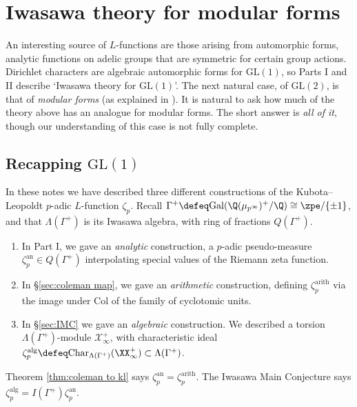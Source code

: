 \documentclass[a4paper,10pt, english, reqno]{smfart}
\newcommand{\GL}{\mathrm{GL}}
\newcommand{\sX}{\mathscr{X}}
\numberwithin{equation}{section}
\begin{document}
\section{Iwasawa theory for modular forms}\label{sec:modular forms}

An interesting source of $L$-functions are those arising from automorphic forms, analytic functions on adelic groups that are symmetric for certain group actions. Dirichlet characters are algebraic automorphic forms for $\GL(1)$, so Parts I and II describe `Iwasawa theory for $\GL(1)$'.  The next natural case, of $\GL(2)$, is that of \emph{modular forms} (as explained in \cite{Wei71}). It is natural to ask how much of the theory above has an analogue for modular forms. The short answer is \textit{all of it}, though our understanding of this case is not fully complete.



\subsection{Recapping $\mathrm{GL}(1)$}

In these notes we have described three different constructions of the Kubota--Leopoldt $p$-adic $L$-function $\zeta_p$. Recall  $\Gamma^+  \defeq \mathrm{Gal}(\Q(\mu_{p^\infty})^+ / \Q) \cong \zpe / \{\pm 1\}$, and that $\Lambda(\Gamma^+)$ is its Iwasawa algebra, with ring of fractions $Q(\Gamma^+)$.

\begin{enumerate}\setlength{\itemsep}{5pt}
	\item In Part I, we gave an \emph{analytic} construction, a $p$-adic pseudo-measure $\zeta_p^{\mathrm{an}} \in Q(\Gamma^+)$ interpolating special values of the Riemann zeta function.
 
	\item In \S\ref{sec:coleman map}, we gave an \emph{arithmetic} construction, defining $\zeta_p^{\mathrm{arith}}$ via the image under $\mathrm{Col}$ of the family of cyclotomic units.
 
	\item In \S\ref{sec:IMC} we gave an \emph{algebraic} construction. We described a torsion $\Lambda(\Gamma^+)$-module $\sX_\infty^+$, with characteristic ideal $\zeta_p^{\mathrm{alg}} \defeq \mathrm{Char}_{\Lambda(\Gamma^+)}(\XX_\infty^+) \subset \Lambda(\Gamma^+)$.
\end{enumerate}

Theorem \ref{thm:coleman to kl} says $\zeta_p^{\mathrm{an}} = \zeta_p^{\mathrm{arith}}$. The Iwasawa Main Conjecture says $\zeta_p^{\mathrm{alg}} = I(\Gamma^+) \zeta_p^{\mathrm{an}}$.
\end{document}
